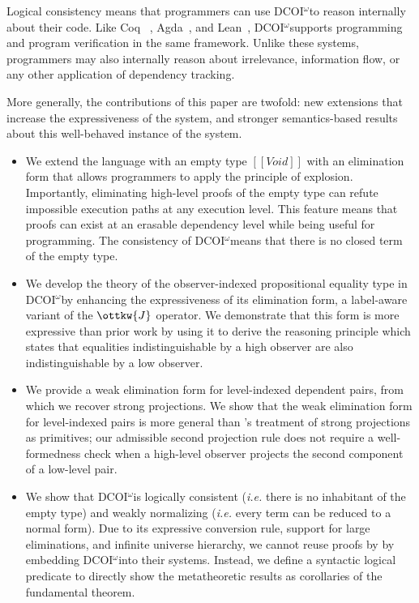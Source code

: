 \documentclass[acmsmall, screen=true, nonacm=true,
  review=\ifpublic false\else true\fi,
  anonymous=\ifanonymous true\else false\fi
]{acmart}
\makeatletter
\newcommand{\name}{\texorpdfstring{DCOI$^{\omega}$\@\xspace}{DCOI-omega}}
\newcommand{\ie}{\textit{i.e.}\@\xspace}
\makeatother
\begin{document}
Logical consistency means that programmers can use \name to reason internally
about their code. Like Coq ~\citep{coq}, Agda~\citep{agda}, and
Lean~\citep{lean}, \name supports programming and program verification in the
same framework. Unlike these systems, programmers may also internally reason
about irrelevance, information flow, or any other application of dependency
tracking.

More generally, the contributions of this paper are twofold: new extensions
that increase the expressiveness of the system, and stronger semantics-based
results about this well-behaved instance of the system.

\begin{itemize}[leftmargin=\parindent]
\item We extend the language with an empty type $[[Void]]$ with an elimination
  form that allows programmers to apply the principle of explosion.
  Importantly, eliminating high-level proofs of the empty
  type can refute impossible execution paths at any execution level. This
  feature means that proofs can exist at an erasable dependency level while
  being useful for programming. The consistency of \name means that there is
  no closed term of the empty type.

\item We develop the theory of the observer-indexed propositional equality
  type in \name by enhancing the expressiveness of its elimination form, a
  label-aware variant of the $\ottkw{J}$ operator. We demonstrate that this
  form is more expressive than prior work by using it to derive the reasoning
  principle which states that equalities indistinguishable by a high observer
  are also indistinguishable by a low observer.

\item We provide a weak elimination form for level-indexed dependent pairs,
  from which we recover strong projections. We show that the weak elimination
  form for level-indexed pairs is more general than \citeauthor{liu:dcoi}'s
  treatment of strong projections as primitives; our admissible second
  projection rule does not require a well-formedness check when a high-level
  observer projects the second component of a low-level pair.

\item We show that \name is logically consistent (\ie there is no inhabitant of
  the empty type) and weakly normalizing (\ie every term can be reduced to a normal
  form). Due to its expressive conversion rule, support for large eliminations,
  and infinite universe hierarchy, we cannot reuse
  proofs by \citet{geuvers:cc-sn, abel:irrelevance}
  by embedding \name into their systems. Instead, we define a
  syntactic logical predicate to directly show the
  metatheoretic results as corollaries of the fundamental theorem.


\end{itemize}
\end{document}

